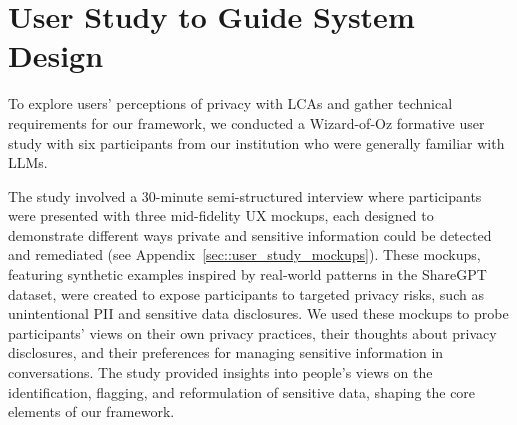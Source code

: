 \section{User Study to Guide System Design}
\label{sec::user_study}

To explore users' perceptions of privacy with LCAs and gather technical requirements for our framework, we conducted a Wizard-of-Oz formative user study with six participants from our institution who were generally familiar with LLMs. 

The study involved a 30-minute semi-structured interview where participants were presented with three mid-fidelity UX mockups, each designed to demonstrate different ways private and sensitive information could be detected and remediated (see Appendix~\ref{sec::user_study_mockups}). These mockups, featuring synthetic examples inspired by real-world patterns in the ShareGPT dataset, were created to expose participants to targeted privacy risks, such as unintentional PII and sensitive data disclosures. We used these mockups to probe participants' views on their own privacy practices, their thoughts about privacy disclosures, and their preferences for managing sensitive information in conversations. The study provided insights into people's views on the identification, flagging, and reformulation of sensitive data, shaping the core elements of our framework.



